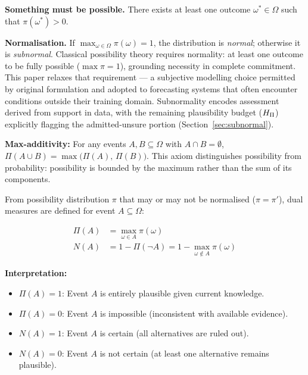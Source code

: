 \begin{axiomlist}
\item \textbf{Something must be possible.} There exists at least one
    outcome $\omega^* \in \Omega$ such that $\pi(\omega^*) > 0$.
\item \textbf{Normalisation.} If
    $\max_{\omega \in \Omega} \pi(\omega) = 1$, the distribution is
    \textit{normal}; otherwise it is \textit{subnormal}. Classical
    possibility theory \citep{Dubois1988-nh}
    requires normality:
    at least one outcome to be fully possible
    ($\max \pi = 1$),
    grounding necessity in complete commitment.
    This paper relaxes that requirement --- a
    subjective modelling choice permitted by
    original formulation \citep{Zadeh1978-je}
    and adopted to forecasting systems that
    often encounter conditions outside their
    training domain. Subnormality encodes
    assessment derived from support in data,
    with the remaining plausibility budget
    ($H_{\Pi}$) explicitly flagging the
    admitted-unsure portion
    (Section~\ref{sec:subnormal}).
\item \textbf{Max-additivity:} For any events $A, B \subseteq \Omega$
    with $A \cap B = \emptyset$,
    $\Pi(A \cup B) = \max\bigl(\Pi(A),\, \Pi(B)\bigr)$.
    This axiom distinguishes possibility from probability: possibility
    is bounded by the maximum rather than the sum of its components.
\end{axiomlist}

From possibility distribution $\pi$ that may or
may not be normalised ($\pi = \pi'$),
dual measures are defined for event
$A \subseteq \Omega$:

\begin{align}
\Pi(A) &= \max_{\omega \in A} \pi(\omega)
    \label{eq:poss} \\
N(A) &= 1 - \Pi(\neg A)
     = 1 - \max_{\omega \notin A} \pi(\omega)
    \label{eq:nec}
\end{align}

\textbf{Interpretation:}
\begin{itemize}[leftmargin=2em]
\item $\Pi(A)=1$: Event $A$ is entirely
    plausible given current knowledge.
\item $\Pi(A)=0$: Event $A$ is impossible (inconsistent with available
    evidence).
\item $N(A)=1$: Event $A$ is certain (all alternatives are ruled out).
\item $N(A)=0$: Event $A$ is not certain (at least one alternative
    remains plausible).
\end{itemize}

